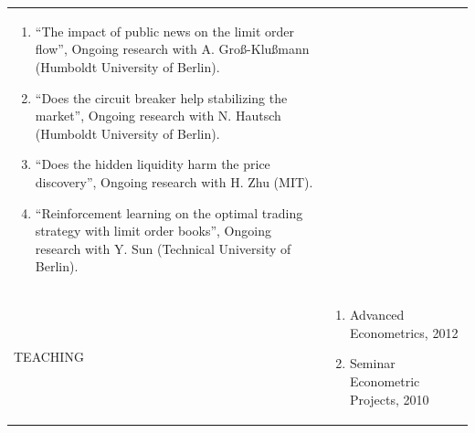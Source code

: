 \documentclass[a4paper,10pt]{article}
\begin{document}
\begin{xtabular}[h]{p{0.15\textwidth}p{0.75\textwidth}}
\begin{enumerate}
    \item ``The impact of public news on the limit order flow'', Ongoing research with A. Gro\ss-Klu{\ss}mann (Humboldt University of Berlin).
    \item ``Does the circuit breaker help stabilizing the market'', Ongoing research with N. Hautsch (Humboldt University of Berlin).
    \item ``Does the hidden liquidity harm the price discovery'', Ongoing research with H. Zhu (MIT).
    \item ``Reinforcement learning on the optimal trading strategy with limit order books'', Ongoing research with Y. Sun (Technical University of Berlin).
  \end{enumerate}\\
  TEACHING&\vspace{-20pt}\begin{enumerate}
    \item Advanced Econometrics, 2012
    \item Seminar Econometric Projects, 2010\newline
  \end{enumerate}
\end{xtabular}
\end{document}
